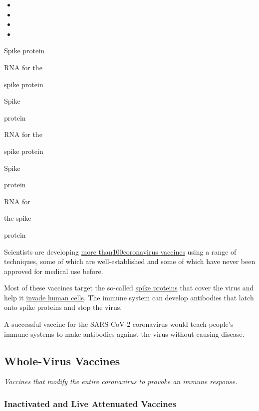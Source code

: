 \begin{itemize}
\item
\item
\item
\item
\end{itemize}

Spike protein

RNA for the

spike protein

Spike

protein

RNA for the

spike protein

Spike

protein

RNA for

the spike

protein

Scientists are developing
\href{https://www.nytimes3xbfgragh.onion/2020/05/20/health/coronavirus-vaccines.html}{more
than}\href{https://www.nytimes3xbfgragh.onion/2020/05/20/health/coronavirus-vaccines.html}{100}\href{https://www.nytimes3xbfgragh.onion/2020/05/20/health/coronavirus-vaccines.html}{coronavirus
vaccines} using a range of techniques, some of which are
well-established and some of which have never been approved for medical
use before.

Most of these vaccines target the so-called
\href{https://www.nytimes3xbfgragh.onion/interactive/2020/04/03/science/coronavirus-genome-bad-news-wrapped-in-protein.html}{spike
proteins} that cover the virus and help it
\href{https://www.nytimes3xbfgragh.onion/interactive/2020/03/11/science/how-coronavirus-hijacks-your-cells.html}{invade
human cells}. The immune system can develop antibodies that latch onto
spike proteins and stop the virus.

A successful vaccine for the SARS-CoV-2 coronavirus would teach people's
immune systems to make antibodies against the virus without causing
disease.

\hypertarget{whole-virus-vaccines}{%
\subsection{\texorpdfstring{\textbf{Whole-Virus
Vaccines}}{Whole-Virus Vaccines}}\label{whole-virus-vaccines}}

\emph{Vaccines that modify the entire coronavirus to provoke an immune
response.}

\hypertarget{inactivated-and-live-attenuated-vaccines}{%
\subsubsection{\texorpdfstring{\textbf{Inactivated and Live Attenuated
Vaccines}}{Inactivated and Live Attenuated Vaccines}}\label{inactivated-and-live-attenuated-vaccines}}


